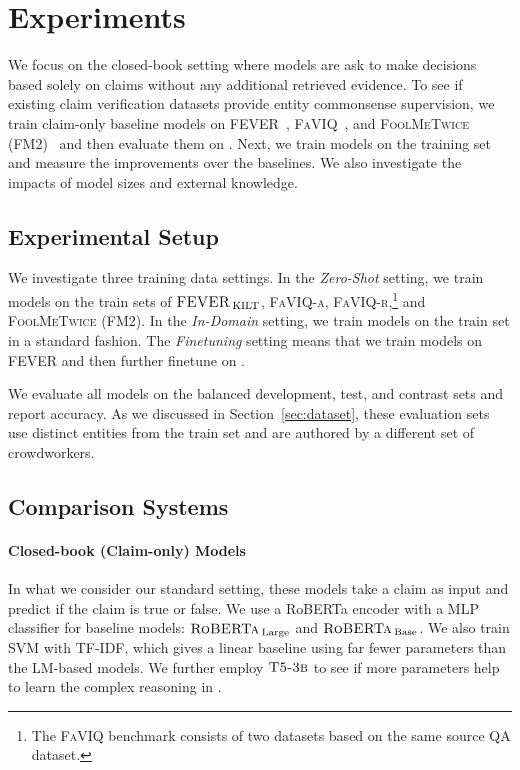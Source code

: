 \section{Experiments}
\label{sec:experiments}

We focus on the closed-book setting where models are ask to make decisions based solely on claims without any additional retrieved evidence. To see if existing claim verification datasets provide entity commonsense supervision, we train claim-only baseline models on \textsc{FEVER}~\citep{fever}, \textsc{FaVIQ}~\citep{Jungsoo_Park_2021}, and \textsc{FoolMeTwice (FM2)}~\citep{Julian_Eisenschlos_2021} and then evaluate them on \ours. Next, we train models on the \ours training set and measure the improvements over the baselines. We also investigate the impacts of model sizes and external knowledge.

\subsection{Experimental Setup} 

We investigate three training data settings. In the \emph{Zero-Shot} setting, we train models on the train sets of $\textsc{FEVER}_{\:\text{KILT}}$, \textsc{FaVIQ-a}, \textsc{FaVIQ-r},\footnote{The \textsc{FaVIQ} benchmark consists of two datasets based on the same source QA dataset.} and \textsc{FoolMeTwice (FM2)}. In the \emph{In-Domain} setting, we train models on the \ours train set in a standard fashion. The \emph{Finetuning} setting means that we train models on \textsc{FEVER} and then further finetune on \oursno. 

We evaluate all models on the \ours balanced development, test, and contrast sets and report accuracy. As we discussed in Section~\ref{sec:dataset}, these evaluation sets use distinct entities from the train set and are authored by a different set of crowdworkers. 

\subsection{Comparison Systems}

\paragraph{Closed-book (Claim-only) Models} In what we consider our standard setting, these models take a claim as input and predict if the claim is true or false. We use a RoBERTa encoder \citep{Yinhan_Liu_19} with a MLP classifier for baseline models: $\textsc{RoBERTa}_{\:\text{Large}}$ and $\textsc{RoBERTa}_{\:\text{Base}}$. We also train SVM with TF-IDF, which gives a linear baseline using far fewer parameters than the LM-based models. We further employ $\textsc{T5-3b}$ to see if more parameters help to learn the complex reasoning in \oursno. 

